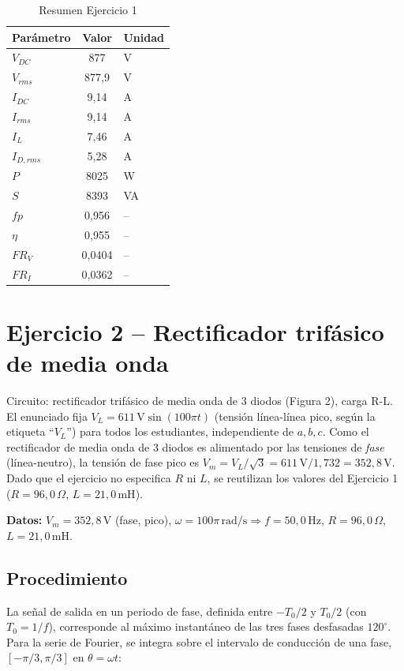 \documentclass[12pt,a4paper]{article}
\begin{document}
\begin{table}[H]
\centering
\begin{tabular}{lcl}
\toprule
\textbf{Parámetro} & \textbf{Valor} & \textbf{Unidad}\\
\midrule
$V_{DC}$ & 877 & V\\
$V_{rms}$ & 877{,}9 & V\\
$I_{DC}$ & 9{,}14 & A\\
$I_{rms}$ & 9{,}14 & A\\
$I_L$ & 7{,}46 & A\\
$I_{D,rms}$ & 5{,}28 & A\\
$P$ & 8025 & W\\
$S$ & 8393 & VA\\
$fp$ & 0{,}956 & --\\
$\eta$ & 0{,}955 & --\\
$FR_V$ & 0{,}0404 & --\\
$FR_I$ & 0{,}0362 & --\\
\bottomrule
\end{tabular}
\caption{Resumen Ejercicio 1}
\end{table}

\newpage
\section{Ejercicio 2 -- Rectificador trifásico de media onda}

Circuito: rectificador trifásico de media onda de 3 diodos (Figura 2), carga R-L.
El enunciado fija $V_L=611\,\text{V}\sin(100\pi t)$ (tensión línea-línea pico,
según la etiqueta ``$V_L$'') para todos los estudiantes, independiente de
$a,b,c$. Como el rectificador de media onda de 3 diodos es alimentado por las
tensiones de \emph{fase} (línea-neutro), la tensión de fase pico es
$V_m=V_L/\sqrt3=611\,\text{V}/1{,}732=352{,}8\,\text{V}$. Dado que el ejercicio
no especifica $R$ ni $L$, se reutilizan los valores del Ejercicio 1
($R=96{,}0\,\Omega$, $L=21{,}0\,\text{mH}$).

\textbf{Datos:} $V_m=352{,}8\,\text{V}$ (fase, pico), $\omega=100\pi\,\text{rad/s}\Rightarrow f=50{,}0\,\text{Hz}$,
$R=96{,}0\,\Omega$, $L=21{,}0\,\text{mH}$.

\subsection{Procedimiento}

La señal de salida en un periodo de fase, definida entre $-T_0/2$ y $T_0/2$
(con $T_0=1/f$), corresponde al máximo instantáneo de las tres fases desfasadas
$120^\circ$. Para la serie de Fourier, se integra sobre el intervalo de
conducción de una fase, $[-\pi/3,\pi/3]$ en $\theta=\omega t$:
\end{document}
